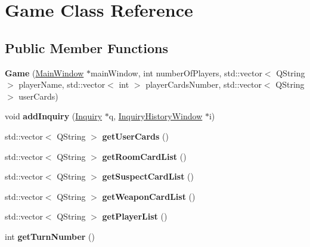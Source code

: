 \hypertarget{classGame}{}\section{Game Class Reference}
\label{classGame}
\subsection*{Public Member Functions}
\begin{DoxyCompactItemize}
\item 
\mbox{\label{classGame_af84b325677133cbd7577beb3bfee1425}} 
{\bfseries Game} (\hyperlink{classMainWindow}{Main\+Window} $\ast$main\+Window, int number\+Of\+Players, std\+::vector$<$ Q\+String $>$ player\+Name, std\+::vector$<$ int $>$ player\+Cards\+Number, std\+::vector$<$ Q\+String $>$ user\+Cards)
\item 
\mbox{\label{classGame_a95ff1e0758fc07e75ccf98c8f30fb7f0}} 
void {\bfseries add\+Inquiry} (\hyperlink{classInquiry}{Inquiry} $\ast$q, \hyperlink{classInquiryHistoryWindow}{Inquiry\+History\+Window} $\ast$i)
\item 
\mbox{\label{classGame_ac64d371749f3b761b8e73bea994445b8}} 
std\+::vector$<$ Q\+String $>$ {\bfseries get\+User\+Cards} ()
\item 
\mbox{\label{classGame_aa53308fd7e8525ce46834a123fa4da4e}} 
std\+::vector$<$ Q\+String $>$ {\bfseries get\+Room\+Card\+List} ()
\item 
\mbox{\label{classGame_a2bb58a8331daae7d32499219fa807dd6}} 
std\+::vector$<$ Q\+String $>$ {\bfseries get\+Suspect\+Card\+List} ()
\item 
\mbox{\label{classGame_aa419aa078deb35ff55622ab365ac5375}} 
std\+::vector$<$ Q\+String $>$ {\bfseries get\+Weapon\+Card\+List} ()
\item 
\mbox{\label{classGame_abe38ad8f1821220acc48c4568dddbae4}} 
std\+::vector$<$ Q\+String $>$ {\bfseries get\+Player\+List} ()
\item 
\mbox{\label{classGame_af839571d0f7046e9c92470f12485cf89}} 
int {\bfseries get\+Turn\+Number} ()
\end{DoxyCompactItemize}
